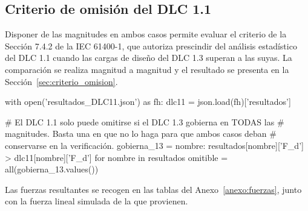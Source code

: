 \subsection*{Criterio de omisión del DLC 1.1}

Disponer de las magnitudes en ambos casos permite evaluar el criterio de la Sección 7.4.2 de la IEC 61400-1, que autoriza prescindir del análisis estadístico del DLC 1.1 cuando las cargas de diseño del DLC 1.3 superan a las suyas. La comparación se realiza magnitud a magnitud y el resultado se presenta en la Sección~\ref{sec:criterio_omision}.

\begin{pycode}
with open('resultados_DLC11.json') as fh:
    dlc11 = json.load(fh)['resultados']

# El DLC 1.1 solo puede omitirse si el DLC 1.3 gobierna en TODAS las
# magnitudes. Basta una en que no lo haga para que ambos casos deban
# conservarse en la verificación.
gobierna_13 = {nombre: resultados[nombre]['F_d'] > dlc11[nombre]['F_d']
               for nombre in resultados}
omitible = all(gobierna_13.values())
\end{pycode}

Las fuerzas resultantes se recogen en las tablas del Anexo~\ref{anexo:fuerzas}, junto con la fuerza lineal simulada de la que provienen.
